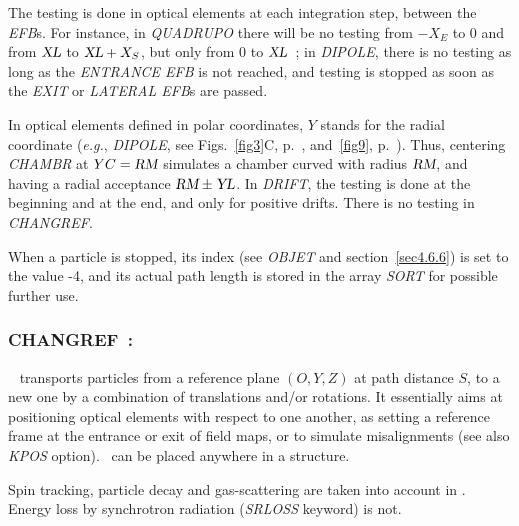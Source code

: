 {\noindent The testing is done in optical elements at each integration step, between the
\textsl{EFB}s. For instance, in \textsl{QUADRUPO} there will be 
no testing from $-X_E $ to 0 and 
from $ \textsl{XL} $ to $ \textsl{XL}+X_S $, but only from 0  to $ \textsl{XL} $~;  in \textsl{DIPOLE}, there is no 
testing as long as the \textsl{ENTRANCE EFB} is not reached, and testing is stopped as 
soon as the \textsl{EXIT} or \textsl{LATERAL EFB}s are passed.  
\bigskip

\noindent In optical elements defined in polar coordinates,  $ Y $  stands for the radial
coordinate (\emph{e.g.}, \textsl{DIPOLE}, see Figs.~\ref{fig3}C, p.~\pageref{fig3}, and~\ref{fig9}, 
p.~\pageref{fig9}).  
 Thus, centering \textsl{CHAMBR} at $ \\YC=\textsl{RM} $ simulates a chamber curved with radius 
 $ \textsl{RM} $, and having a radial acceptance $ \textsl{RM} \pm \textsl{YL} $.  In  \textsl{DRIFT}, the testing  is done 
 at the beginning and at the end, and only for positive drifts.  There 
is no testing in \textsl{CHANGREF}.  
\bigskip

\noindent When a particle is stopped, its index 
\IEX{}  (see \textsl{OBJET} and 
section~\ref{sec4.6.6}) is set to the value -4, and its actual path length is stored in the array 
\textsl{SORT} for possible further use. 




\newpage

\subsubsection*{CHANGREF~: \CHANGREFTitl} \label{CHANGREF}
\medskip 

\noindent \CHANGREF\        
transports  particles from a reference plane  $(O,Y,Z)$  at path distance $S$, to a new one by a combination of 
translations and/or rotations.  It essentially aims at positioning optical elements with respect 
to one another, 
as setting a reference frame at the entrance
or exit of field maps, or to simulate misalignments (see also  \textsl{KPOS} option).  
 \CHANGREF\      can be placed anywhere in a structure. 

\medskip

\noindent  Spin tracking, 
particle decay and gas-scattering are taken into account in  \CHANGREF. 
Energy loss by synchrotron radiation (\textsl{SRLOSS} keyword) is not. 

}
